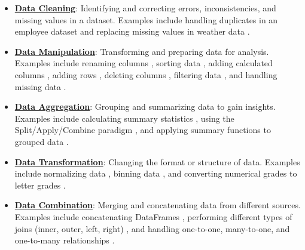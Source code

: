 \documentclass{article}%
\begin{document}
\begin{itemize}[leftmargin=*]%
\item \href{https://purdue.brightspace.com/d2l/common/assets/pdfjs-d2l-dist/1.0.14-legacy/web/viewer.html?file=\%2Fcontent\%2Fenforced\%2F1095465-WL.202510.CS24200.LE1\%2F06L3-wrangling.pdf\%3Fou\%3D1095465\&lang=en-us\&container=d2l-fileviewer-rendered-pdf\&fullscreen=d2l-fileviewer-rendered-pdf-dialog\&height=667#page=23}{\textbf{Data Cleaning}}: Identifying and correcting errors, inconsistencies, and missing values in a dataset. Examples include handling duplicates in an employee dataset  and replacing missing values in weather data .%
\item \href{https://purdue.brightspace.com/d2l/common/assets/pdfjs-d2l-dist/1.0.14-legacy/web/viewer.html?file=\%2Fcontent\%2Fenforced\%2F1095465-WL.202510.CS24200.LE1\%2F06L3-wrangling.pdf\%3Fou\%3D1095465\&lang=en-us\&container=d2l-fileviewer-rendered-pdf\&fullscreen=d2l-fileviewer-rendered-pdf-dialog\&height=667#page=4}{\textbf{Data Manipulation}}: Transforming and preparing data for analysis. Examples include renaming columns , sorting data , adding calculated columns , adding rows , deleting columns , filtering data , and handling missing data .%
\item \href{https://purdue.brightspace.com/d2l/common/assets/pdfjs-d2l-dist/1.0.14-legacy/web/viewer.html?file=\%2Fcontent\%2Fenforced\%2F1095465-WL.202510.CS24200.LE1\%2F06L3-wrangling.pdf\%3Fou\%3D1095465\&lang=en-us\&container=d2l-fileviewer-rendered-pdf\&fullscreen=d2l-fileviewer-rendered-pdf-dialog\&height=667#page=8}{\textbf{Data Aggregation}}: Grouping and summarizing data to gain insights. Examples include calculating summary statistics , using the Split/Apply/Combine paradigm , and applying summary functions to grouped data .%
\item \href{https://purdue.brightspace.com/d2l/common/assets/pdfjs-d2l-dist/1.0.14-legacy/web/viewer.html?file=\%2Fcontent\%2Fenforced\%2F1095465-WL.202510.CS24200.LE1\%2F06L3-wrangling.pdf\%3Fou\%3D1095465\&lang=en-us\&container=d2l-fileviewer-rendered-pdf\&fullscreen=d2l-fileviewer-rendered-pdf-dialog\&height=667#page=47}{\textbf{Data Transformation}}: Changing the format or structure of data. Examples include normalizing data , binning data , and converting numerical grades to letter grades .%
\item \href{https://purdue.brightspace.com/d2l/common/assets/pdfjs-d2l-dist/1.0.14-legacy/web/viewer.html?file=\%2Fcontent\%2Fenforced\%2F1095465-WL.202510.CS24200.LE1\%2F06L3-wrangling.pdf\%3Fou\%3D1095465\&lang=en-us\&container=d2l-fileviewer-rendered-pdf\&fullscreen=d2l-fileviewer-rendered-pdf-dialog\&height=667#page=59}{\textbf{Data Combination}}: Merging and concatenating data from different sources. Examples include concatenating DataFrames , performing different types of joins (inner, outer, left, right) , and handling one-to-one, many-to-one, and one-to-many relationships .%

\end{itemize}
\end{document}
